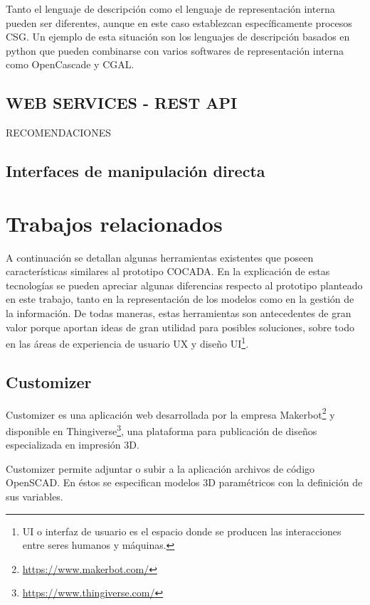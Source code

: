 Tanto el lenguaje de descripción como el lenguaje de representación interna pueden ser diferentes, aunque en este caso establezcan específicamente procesos CSG. Un ejemplo de esta situación son los lenguajes de descripción basados en python que pueden combinarse con varios softwares de representación interna como OpenCascade y CGAL.

\clearpage


\clearpage






\subsection{WEB SERVICES - REST API}
RECOMENDACIONES

\subsection{Interfaces de manipulación directa}


\clearpage
\section{Trabajos relacionados}
A continuación se detallan algunas herramientas existentes que poseen características similares al prototipo COCADA. 
En la explicación de estas tecnologías se pueden apreciar algunas diferencias respecto al prototipo planteado en este trabajo, tanto en la representación de los modelos como en la gestión de la información. De todas maneras, estas herramientas son antecedentes de gran valor porque aportan ideas de gran utilidad para posibles soluciones, sobre todo en las áreas de experiencia de usuario UX y diseño UI\footnote{UI o interfaz de usuario es el espacio donde se producen las interacciones entre seres humanos y máquinas.}.

\subsection{Customizer}
Customizer\citep{MakerBot2018} es una aplicación web desarrollada por la empresa Makerbot\footnote{\url{https://www.makerbot.com/}} y disponible en Thingiverse\footnote{\url{https://www.thingiverse.com/}}, una plataforma para publicación de diseños  especializada en impresión 3D.

Customizer permite adjuntar o subir a la aplicación archivos de código OpenSCAD. En éstos se especifican modelos 3D paramétricos con la definición de sus variables.

